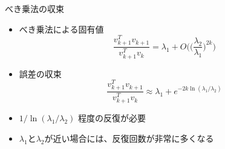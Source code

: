 \begin{frame}[t,fragile]{べき乗法の収束}
  \begin{itemize}
  \item べき乗法による固有値
    \[
    \frac{v_{k+1}^T v_{k+1}}{v_{k+1}^T v_k} = \lambda_1 + O\Big( \big(\frac{\lambda_2}{\lambda_1} \big)^{2k}\Big)
    \]
  \item 誤差の収束
    \[
    \frac{v_{k+1}^T v_{k+1}}{v_{k+1}^T v_k} \approx \lambda_1 + e^{-2k \ln (\lambda_1/\lambda_2)}
    \]
  \item $1 / \ln (\lambda_1/\lambda_2)$ 程度の反復が必要
  \item $\lambda_1$と$\lambda_2$が近い場合には、反復回数が非常に多くなる
  \end{itemize}
\end{frame}
